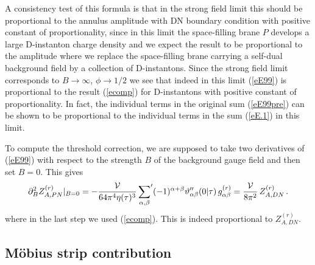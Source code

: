 \documentclass[12pt,a4paper]{article}
\newcommand{\be}{\begin{equation}}
\newcommand{\ee}{\end{equation}}
\newcommand{\refb}[1]{(\ref{#1})}
\newcommand{\p}{\partial}
\newcommand{\vt}{\vartheta}
\newcommand{\VV}{{\cal V}}
\def\gr{g^{(r)}}
\def\Zr{Z^{(r)}}
\begin{document}
A consistency test of this formula is that in the strong field limit this should be proportional
to the annulus amplitude with DN boundary condition with positive constant of proportionality, since
in this limit the space-filling brane $P$
develops a large D-instanton charge density and we expect the
result to be proportional to the amplitude where we replace the space-filling brane carrying
a self-dual background field by a collection of D-instantons. Since the strong field limit corresponds to $B\to\infty$,
$\phi\to{1/2}$ we see that indeed in this limit \refb{eE99} is proportional to the result \refb{ecomp} for
D-instantons with positive constant of proportionality. In fact, the individual terms in the
original sum \refb{eE99pre} can be shown to be proportional to the individual terms in
the sum \refb{eE.1} in this limit.

To compute the threshold correction, we are supposed to take two derivatives of
\refb{eE99} with respect to the strength $B$ of the background gauge field and
then set $B=0$. This gives
\be
\label{eE.11}
\p_B^2 \Zr_{A,PN}|_{B=0}=-\frac{\VV}{64\pi^{4}\eta(\tau)^3} \,
{\sum_{\alpha,\beta}}' (-1)^{\alpha+\beta} \vt''_{\alpha\beta}(0|\tau)\, \gr_{\alpha\beta}
= {\VV\over 8\pi^2}\, \Zr_{A,DN}\, .
\ee
where in the last step we used \refb{ecomp}. This is indeed proportional to $\Zr_{A,DN}$.

\subsection{M\"{o}bius strip contribution} \label{sF.2}
\end{document}
